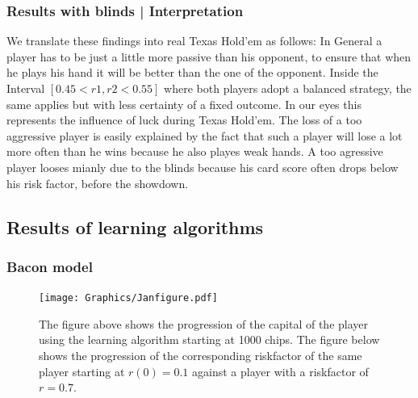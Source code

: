 \documentclass[11pt]{article}
\begin{document}
\subsubsection{Results with blinds | Interpretation}

We translate these findings into real Texas Hold’em as follows: In General a player has to be just a little more passive than his opponent, to ensure that when he plays his hand it will be better than the one of the opponent.
Inside the Interval $[0.45 < r1,r2 < 0.55]$ where both players adopt a balanced strategy, the same applies but with less certainty of a fixed outcome. In our eyes this represents the influence of luck during Texas Hold’em. The loss of a too aggressive player is easily explained by the fact that such a player will lose a lot more often than he wins because he also playes weak hands. A too agressive player looses mianly due to the blinds because his card score often drops below his risk factor, before the showdown.

\subsection{Results of learning algorithms}
\subsubsection{Bacon model}

\begin{figure}[h!]
\centering
\texttt{[image: Graphics/Janfigure.pdf]}
\caption{The figure above shows the progression of the capital of the player using the learning algorithm starting at 1000 chips. The figure below shows the progression of the corresponding riskfactor of the same player starting at $r(0)=0.1$ against a player with a riskfactor of $r=0.7$.\label{Abbildung}}
\end{figure}
\end{document}
